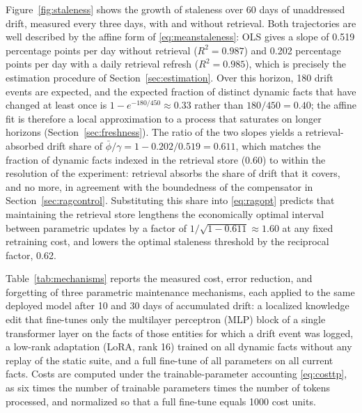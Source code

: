 \documentclass[electronics,article,submit,pdftex,moreauthors]{Definitions/mdpi}
\newcommand{\phibar}{\bar{\phi}}
\begin{document}
Figure~\ref{fig:staleness} shows the growth of staleness over 60 days of unaddressed drift, measured every three days, with and without retrieval. Both trajectories are well described by the affine form of \eqref{eq:meanstaleness}: OLS gives a slope of 0.519 percentage points per day without retrieval ($R^2=0.987$) and 0.202 percentage points per day with a daily retrieval refresh ($R^2=0.985$), which is precisely the estimation procedure of Section~\ref{sec:estimation}. Over this horizon, 180 drift events are expected, and the expected fraction of distinct dynamic facts that have changed at least once is $1-e^{-180/450}\approx 0.33$ rather than $180/450=0.40$; the affine fit is therefore a local approximation to a process that saturates on longer horizons (Section~\ref{sec:freshness}). The ratio of the two slopes yields a retrieval-absorbed drift share of $\phibar/\gamma=1-0.202/0.519=0.611$, which matches the fraction of dynamic facts indexed in the retrieval store (0.60) to within the resolution of the experiment: retrieval absorbs the share of drift that it covers, and no more, in agreement with the boundedness of the compensator in Section~\ref{sec:ragcontrol}. Substituting this share into \eqref{eq:ragopt} predicts that maintaining the retrieval store lengthens the economically optimal interval between parametric updates by a factor of $1/\sqrt{1-0.611}\approx 1.60$ at any fixed retraining cost, and lowers the optimal staleness threshold by the reciprocal factor, 0.62.

Table~\ref{tab:mechanisms} reports the measured cost, error reduction, and forgetting of three parametric maintenance mechanisms, each applied to the same deployed model after 10 and 30 days of accumulated drift: a localized knowledge edit that fine-tunes only the multilayer perceptron (MLP) block of a single transformer layer on the facts of those entities for which a drift event was logged, a low-rank adaptation (LoRA, rank 16) trained on all dynamic facts without any replay of the static suite, and a full fine-tune of all parameters on all current facts. Costs are computed under the trainable-parameter accounting \eqref{eq:costtp}, as six times the number of trainable parameters times the number of tokens processed, and normalized so that a full fine-tune equals 1000 cost units.
\end{document}
